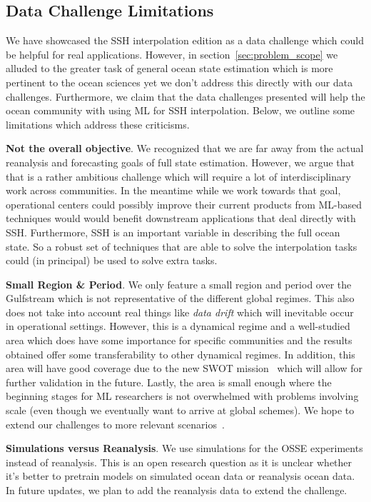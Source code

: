 \newpage
\subsection{Data Challenge Limitations}

We have showcased the SSH interpolation edition as a data challenge which could be helpful for real applications. 
However, in section~\ref{sec:problem_scope} we alluded to the greater task of general ocean state estimation which is more pertinent to the ocean sciences yet we don't address this directly with our data challenges.
Furthermore, we claim that the data challenges presented will help the ocean community with using ML for SSH interpolation.
Below, we outline some limitations which address these criticisms.

\textbf{Not the overall objective}. 
We recognized that we are far away from the actual reanalysis and forecasting goals of full state estimation. 
However, we argue that that is a rather ambitious challenge which will require a lot of interdisciplinary work across communities. 
In the meantime while we work towards that goal, operational centers could possibly improve their current products from ML-based techniques would would benefit downstream applications that deal directly with SSH.
Furthermore, SSH is an important variable in describing the full ocean state.
So a robust set of techniques that are able to solve the interpolation tasks could (in principal) be used to solve extra tasks.

\textbf{Small Region \& Period}.
We only feature a small region and period over the Gulfstream which is not representative of the different global regimes. 
This also does not take into account real things like \textit{data drift} which will inevitable occur in operational settings.
However, this is a dynamical regime and a well-studied area which does have some importance for specific communities and the results obtained offer some transferability to other dynamical regimes.
In addition, this area will have good coverage due to the new SWOT mission~\cite{SWOT} which will allow for further validation in the future.
Lastly, the area is small enough where the beginning stages for ML researchers is not overwhelmed with problems involving scale (even though we eventually want to arrive at global schemes).
We hope to extend our challenges to more relevant scenarios~\cite{MDSALONGTRACK}.

\textbf{Simulations versus Reanalysis}. We use simulations for the OSSE experiments instead of reanalysis. This is an open research question as it is unclear whether it's better to pretrain models on simulated ocean data or reanalysis ocean data. In future updates, we plan to add the reanalysis data to extend the challenge.


